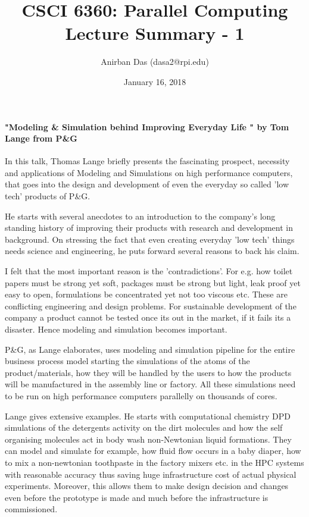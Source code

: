 \documentclass[a4paper,12 pt]{article}
\title{\vspace{-2.0cm}CSCI 6360: Parallel Computing Lecture Summary - 1}
\author{Anirban Das (dasa2@rpi.edu) }
\date{January 16, 2018}
\begin{document}
\maketitle

\paragraph{"Modeling \& Simulation behind Improving Everyday Life " by Tom Lange from P\&G\\}

In this talk, Thomas Lange briefly presents the fascinating prospect, necessity and applications of Modeling and Simulations on high performance computers, that goes into the design and development of even the everyday so called 'low tech' products of P\&G.

He starts with several anecdotes to an introduction to the company's long standing history of improving their products with research and development in background. On stressing the fact that even creating everyday 'low tech' things needs science and engineering, he puts forward several reasons to back his claim.

I felt that the most important reason is the 'contradictions'. For e.g. how toilet papers must be strong yet soft, packages must be strong but light, leak proof yet easy to open, formulations be concentrated yet not too viscous etc. These are conflicting engineering and design problems. For sustainable development of the company a product cannot be tested once its out in the market, if it fails its a disaster. Hence modeling and simulation becomes important.

P\&G, as Lange elaborates, uses modeling and simulation pipeline for the entire business process model starting the simulations of the atoms of the product/materials, how they will be handled by the users to how the products will be manufactured in the assembly line or factory. All these simulations need to be run on high performance computers parallelly on thousands of cores.

Lange gives extensive examples. He starts with computational chemistry DPD simulations of the detergents activity on the dirt molecules and how the self organising molecules act in body wash non-Newtonian liquid formations. They can model and simulate for example, how fluid flow occurs in a baby diaper, how to mix a non-newtonian toothpaste in the factory mixers etc. in the HPC systems with reasonable accuracy thus saving huge infrastructure cost of actual physical experiments. Moreover, this allows them to make design decision and changes even before the prototype is made and much before the infrastructure is commissioned.
\end{document}

